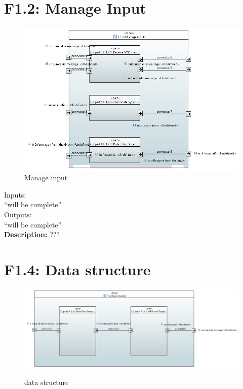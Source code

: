 \documentclass{template/openetcs_report}
\begin{document}
\section{F1.2: Manage Input}
\begin{figure}[hbtp]
\centering
\includegraphics [scale=0.9] {images/Manage_inputs}
\caption{Manage input}
\end{figure}

  Inputs:\\
``will be complete''\\

 Outputs:\\
 ``will be complete''\\
 
 \textbf{ Description:} ???
 
 \newpage
 \section{F1.4: Data structure}
\begin{figure}[hbtp]
\centering
\includegraphics [scale=0.5] {images/data_structure}\\
\caption{data structure}
\end{figure}
\end{document}
